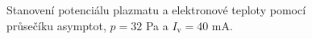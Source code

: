 \documentclass[a4paper,12pt]{article}
\begin{document}
\begin{figure}[h]
	\centering
	\begin{subfigure}[b]{.49\textwidth}
		\centering
	\end{subfigure}
	\begin{subfigure}[b]{.49\textwidth}
		\centering
	\end{subfigure}
	\caption{Stanovení potenciálu plazmatu a elektronové teploty pomocí 
		průsečíku asymptot, $p = 32$ \si{\pascal} a $I_\text{v} = 40$ 
		\si{\milli\ampere}.}
	\label{data5}
\end{figure}
\end{document}
